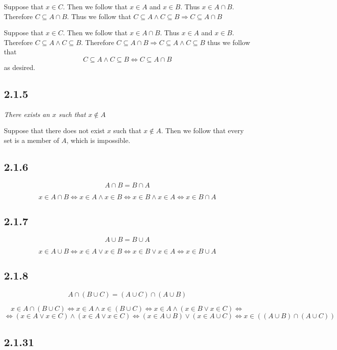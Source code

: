 \documentclass[11pt,oneside,titlepage]{book}
\DeclareMathOperator \lra {\Leftrightarrow}
\DeclareMathOperator \imp {\Rightarrow}
\begin{document}
Suppose that $x \in C$. Then we follow that $x \in A$ and $x \in B$. Thus $x \in A \cap B$.
Therefore $C \subseteq A \cap B$. Thus we follow that
$C \subseteq A \land C \subseteq B \imp C \subseteq A \cap B$

Suppose that $x \in C$. Then we follow that $x \in A \cap B$. Thus $x \in A$ and $x \in B$.
Therefore $C \subseteq A \land C \subseteq B$. Therefore
$C \subseteq A \cap B \imp C \subseteq A \land C \subseteq B $
thus we follow that
$$C \subseteq A \land C \subseteq B \iff C \subseteq A \cap B$$
as desired.

\subsection*{2.1.5}

\textit{There exists an $x$ such that $x \notin A$}

Suppose that there does not exist $x$ such that $x \notin A$. Then we follow that every set is a
member of $A$, which is impossible.

\subsection*{2.1.6}

$$A \cap B = B \cap A$$

$$x \in A \cap B \iff x \in A \land x \in B \iff x \in B \land x \in A \iff x \in B \cap A$$

\subsection*{2.1.7}

$$A \cup B = B \cup A$$

$$x \in A \cup B \iff x \in A \lor x \in B \iff x \in B \lor x \in A \iff x \in B \cup A$$

\subsection*{2.1.8}

$$A \cap (B \cup C) = (A \cup C) \cap (A \cup B)$$

$$x \in A \cap (B \cup C) \lra  x \in A \land x \in (B \cup C) \lra
x \in A \land (x \in B \lor x \in C) \lra
$$
$$ \lra (x \in A \lor x \in C) \land (x \in A \lor x \in C)
\lra (x \in A \cup B) \lor (x \in A \cup C) \lra x \in ((A \cup B) \cap (A \cup C))$$

\subsection*{2.1.31}
\end{document}
